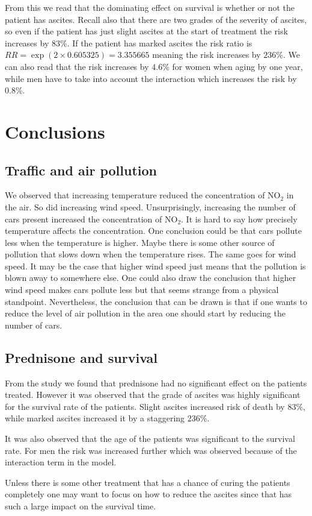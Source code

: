 \documentclass[a4paper]{article}
\begin{document}
From this we read that the dominating effect on survival is whether or not the patient has ascites. Recall also that there are two grades of the severity of ascites, so even if the patient has just slight ascites at the start of treatment the risk increases by $83\%$. If the patient has marked ascites the risk ratio is $RR = \exp(2\times0.605325)=3.355665$ meaning the risk increases by $236\%$. 
We can also read that the risk increases by $4.6\%$ for women when aging by one year, while men have to take into account the interaction which increases the risk by $0.8\%$. 
\section{Conclusions} \label{sec:conclusions}
\subsection{Traffic and air pollution}
We observed that increasing temperature reduced the concentration of NO$_2$ in the air. So did increasing wind speed. Unsurprisingly, increasing the number of cars present increased the concentration of NO$_2$. 
It is hard to say how precisely temperature affects the concentration. One conclusion could be that cars pollute less when the temperature is higher. Maybe there is some other source of pollution that slows down when the temperature rises.
The same goes for wind speed. It may be the case that higher wind speed just means that the pollution is blown away to somewhere else. One could also draw the conclusion that higher wind speed makes cars pollute less but that seems strange from a physical standpoint. 
Nevertheless, the conclusion that can be drawn is that if one wants to reduce the level of air pollution in the area one should start by reducing the number of cars.

\subsection{Prednisone and survival}
From the study we found that prednisone had no significant effect on the patients treated. However it was observed that the grade of ascites was highly significant for the survival rate of the patients. Slight ascites increased risk of death by $83\%$, while marked ascites increased it by a staggering $236\%$. 

It was also observed that the age of the patients was significant to the survival rate. For men the risk was increased further which was observed because of the interaction term in the model.

Unless there is some other treatment that has a chance of curing the patients completely one may want to focus on how to reduce the ascites since that has such a large impact on the survival time.
\end{document}
